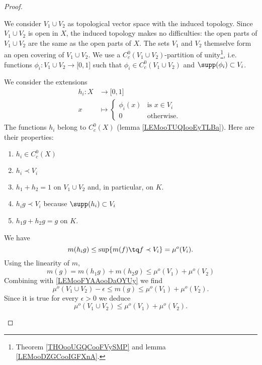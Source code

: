 \begin{proof}
\begin{subproof}
		We consider \( V_1\cup V_2\) as topological vector space with the induced topology. Since \( V_1\cup V_2\) is open in \( X\), the induced topology makes no difficulties: the open parts of \( V_1\cup V_2\) are the same as the open parts of \( X\). The sets \( V_1\) and \( V_2\) themselve form an open covering of \( V_1\cup V_2\). We use a \( C_c^0(V_1\cup V_2)\)-partition of unity\footnote{Theorem \ref{THOooUGQCooFVySMP} and lemma \ref{LEMooDZGCooIGFXnA}.}, i.e. functions \( \phi_i\colon V_1\cup V_2\to \mathopen[ 0 , 1 \mathclose]\) such that \( \phi_i\in C^0_c(V_1\cup V_2)\) and \( \supp(\phi_i)\subset V_i\).

		We consider the extensions
		\begin{equation}
			\begin{aligned}
				h_i\colon X & \to \mathopen[ 0 , 1 \mathclose]        \\
				x           & \mapsto \begin{cases}
					                      \phi_i(x) & \text{is } x\in V_i \\
					                      0         & \text{otherwise. }
				                      \end{cases}
			\end{aligned}
		\end{equation}
		The functions \( h_i\) belong to \( C^0_c(X)\) (lemma \ref{LEMooTUQIooEyTLBa}). Here are their properties:
		\begin{enumerate}
			\item
			      \( h_i\in C^0_c(X)\)
			\item
			      \( h_i\prec V_i\)
			\item
			      \( h_1+h_2=1\) on \( V_1\cup V_2\) and, in particular, on \( K\).
			\item
			      \( h_ig\prec V_i\) because \( \supp(h_i)\subset V_i\)
			\item
			      \( h_1g+h_2g=g\) on \( K \).
		\end{enumerate}
		We have
		\begin{equation}
			m(h_ig)\leq \sup\{ m(f)\tq f\prec V_i \}=\mu^o(V_i).
		\end{equation}
		Using the linearity of \( m\),
		\begin{equation}
			m(g)=m(h_1g)+m(h_2g)\leq \mu^o(V_1)+\mu^o(V_2)
		\end{equation}
		Combining with \eqref{LEMooFYAAooDaOYUy} we find
		\begin{equation}
			\mu^o(V_1\cup V_2)-\epsilon\leq m(g)\leq \mu^o(V_1)+\mu^o(V_2).
		\end{equation}
		Since it is true for every \( \epsilon>0\) we deduce
		\begin{equation}
			\mu^o(V_1\cup V_2)\leq \mu^o(V_1)+\mu^o(V_2).
		\end{equation}


\end{subproof}
\end{proof}
